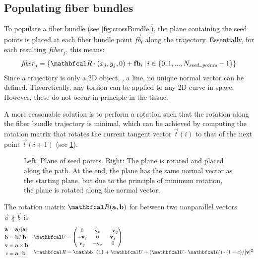 \subsection{Populating fiber bundles}\label{sec:fillBundle}
%
To populate a fiber bundle (see \cref{fig:crossBundle}), the plane containing the seed points is placed at each fiber bundle point $\vec{fb}_i$ along the trajectory.
Essentially, for each resulting $\mathit{fiber}_j$, this means:
%
\begin{align}
    \mathit{fiber}_j = \left\{ \mat{R} \cdot (x_j, y_j, 0) + \vec{fb}_i \, | \, i \in \{0,1,...,N_{\mathit{seed\tum{}points}}-1\}\right\}
\end{align}
%
Since a trajectory is only a 2D object, \ie{}, a line, no unique normal vector can be defined.
Theoretically, any torsion can be applied to any 2D curve in space.
However, these do not occur in principle in the tissue.
\par
%
A more reasonable solution is to perform a rotation such that the rotation along the fiber bundle trajectory is minimal, which can be achieved by computing the rotation matrix that rotates the current tangent vector $\vec{t}(i)$ to that of the next point $\vec{t}(i+1)$ (see \cref{fig:torsion}).
%
\begin{figure}[!t]
    \centering
    \setlength{\tikzwidth}{0.75\textwidth}
    \caption[]{Left: Plane of seed points. Right: The plane is rotated and placed along the path. At the end, the plane has the same normal vector as the starting plane, but due to the principle of minimum rotation, the plane is rotated along the normal vector.}
    \label{fig:torsion}
\end{figure}
%
The rotation matrix $\mat{R}(\vec{a}, \vec{b})$ for between two nonparallel vectors $\vec{a} \nparallel \vec{b}$ is
\begin{align}
\begin{split}
    \vec{a} =& \; \vec{a} / |\vec{a}|\\
    \vec{b} =& \; \vec{b} / |\vec{b}|\\
    \vec{v} =& \; \vec{a} \times \vec{b}\\
    c =& \; \vec{a} \cdot \vec{b}
\end{split}
\quad
\begin{split}
    \mat{U} =& \begin{pmatrix} 0 & \vec{v}_z & -\vec{v}_y\\ -\vec{v}_z & 0 & \vec{v}_x\\ \vec{v}_y & -\vec{v}_x & 0\end{pmatrix}\\
    \mat{R} =& \; \mathbb{1} + \mat{U} + (\mat{U} \cdot \mat{U}) \cdot (1 - c) / |\vec{v}|^2
\end{split}
\end{align}
